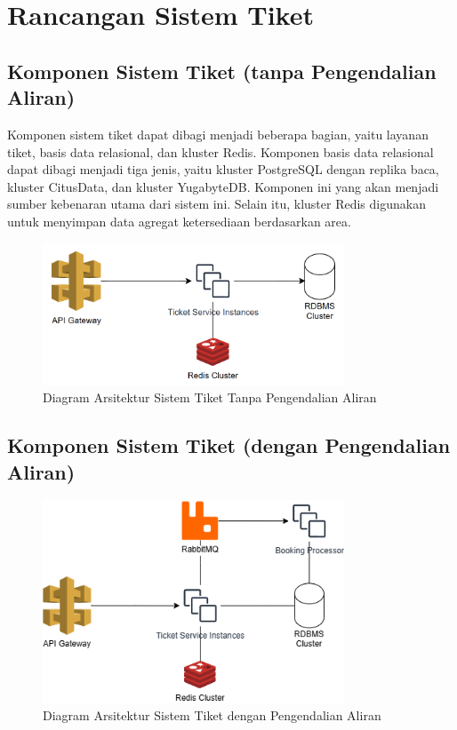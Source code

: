 \section{Rancangan Sistem Tiket}

\subsection{Komponen Sistem Tiket (tanpa Pengendalian Aliran)}

Komponen sistem tiket dapat dibagi menjadi beberapa bagian, yaitu layanan tiket, basis data relasional, dan kluster Redis. Komponen basis data relasional dapat dibagi menjadi tiga jenis, yaitu kluster PostgreSQL dengan replika baca, kluster CitusData, dan kluster YugabyteDB. Komponen ini yang akan menjadi sumber kebenaran utama dari sistem ini. Selain itu, kluster Redis digunakan untuk menyimpan data agregat ketersediaan berdasarkan area.

\begin{figure}[htbp]
    \centering
    \includegraphics[width=0.8\textwidth]{resources/chapter-3/ticket-nofc.png}
    \caption{Diagram Arsitektur Sistem Tiket Tanpa Pengendalian Aliran}
    \label{fig:ticket-nofc}
\end{figure}

\subsection{Komponen Sistem Tiket (dengan Pengendalian Aliran)}

\begin{figure}[htbp]
    \centering
    \includegraphics[width=0.8\textwidth]{resources/chapter-3/ticket-fc.png}
    \caption{Diagram Arsitektur Sistem Tiket dengan Pengendalian Aliran}
    \label{fig:ticket-fc}
\end{figure}

